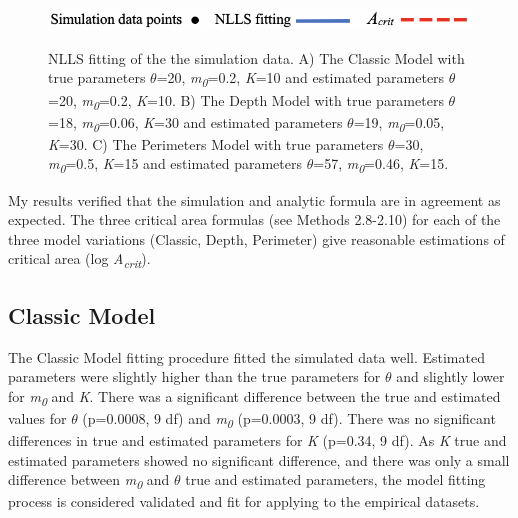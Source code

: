 {\begin{figure}[htbp]
\includegraphics[width=.7\textwidth]{Legend.png}\\
\caption{NLLS fitting of the the simulation data. A) The Classic Model with true parameters $\theta$=20, \textit{m\textsubscript{0}}=0.2, \textit{K}=10 and estimated parameters $\theta$=20, \textit{m\textsubscript{0}}=0.2, \textit{K}=10. B) The Depth Model with true parameters $\theta$=18, \textit{m\textsubscript{0}}=0.06, \textit{K}=30 and estimated parameters $\theta$=19, \textit{m\textsubscript{0}}=0.05, \textit{K}=30. C) The Perimeters Model with true parameters $\theta$=30, \textit{m\textsubscript{0}}=0.5, \textit{K}=15 and estimated parameters $\theta$=57, \textit{m\textsubscript{0}}=0.46, \textit{K}=15.}
\label{fig:myfig}
\end{figure}

\noindent My results verified that the simulation and analytic formula are in agreement as expected. The three critical area formulas (see Methods 2.8-2.10) for each of the three model variations (Classic, Depth, Perimeter) give reasonable estimations of critical area (log \textit{A\textsubscript{crit}}).

\subsection{Classic Model}

\noindent The Classic Model fitting procedure fitted the simulated data well. Estimated parameters were slightly higher than the true parameters for $\theta$ and slightly lower for \textit{m\textsubscript{0}} and \textit{K}. There was a significant difference between the true and estimated values for $\theta$ (p=0.0008, 9 df) and \textit{m\textsubscript{0}} (p=0.0003, 9 df). There was no significant differences in true and estimated parameters for \textit{K} (p=0.34, 9 df).  As \textit{K} true and estimated parameters showed no significant difference, and there was only a small difference between \textit{m\textsubscript{0}} and $\theta$ true and estimated parameters, the model fitting process is considered validated and fit for applying to the empirical datasets.   \\


}
